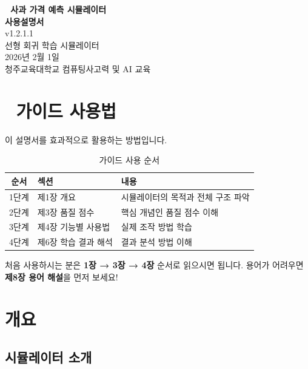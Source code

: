 \documentclass[11pt,a4paper]{article}
\begin{document}
\begin{titlepage}
\centering
\vspace*{3cm}
{\Huge\bfseries 🍎 사과 가격 예측 시뮬레이터\\[0.5cm]
사용설명서}\\[2cm]
{\Large\color{appleRed} v1.2.1.1}\\[1cm]
{\large 선형 회귀 학습 시뮬레이터}\\[3cm]
{\large 2026년 2월 1일}\\[2cm]
\vfill
{\small 청주교육대학교 컴퓨팅사고력 및 AI 교육}
\end{titlepage}

\tableofcontents
\newpage

\section{📘 가이드 사용법}

이 설명서를 효과적으로 활용하는 방법입니다.

\begin{table}[H]
\centering
\caption{가이드 사용 순서}
\label{tab:guide_usage}
\begin{tabularx}{\textwidth}{c|l|X}
\toprule
\textbf{순서} & \textbf{섹션} & \textbf{내용} \\
\midrule
1단계 & 제1장 개요 & 시뮬레이터의 목적과 전체 구조 파악 \\
2단계 & 제3장 품질 점수 & 핵심 개념인 품질 점수 이해 \\
3단계 & 제4장 기능별 사용법 & 실제 조작 방법 학습 \\
4단계 & 제6장 학습 결과 해석 & 결과 분석 방법 이해 \\
\bottomrule
\end{tabularx}
\end{table}

\begin{tipbox}
처음 사용하시는 분은 \textbf{1장 → 3장 → 4장} 순서로 읽으시면 됩니다. 
용어가 어려우면 \textbf{제8장 용어 해설}을 먼저 보세요!
\end{tipbox}

\section{개요}

\subsection{시뮬레이터 소개}
\end{document}

